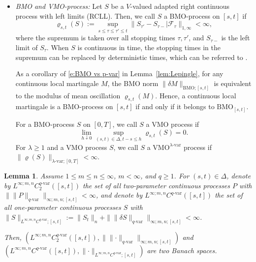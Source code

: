 \documentclass[11pt,reqno]{amsart}
\newtheorem{lemma}{Lemma}[section]
\numberwithin{equation}{section}
\begin{document}
\begin{itemize}[leftmargin=1.2em, labelsep=0.2em]
\ 

\item {\it \emph{BMO} and \emph{VMO}-process:} Let $S$ be a $V$-valued adapted right continuous process with left limits (\textrm{RCLL}). Then, we call $S$ a \textrm{BMO}-process on $[s,t]$ if
\begin{equation*}
\varrho_{s,t}(S) := \sup_{s \le \tau \le \tau' \le t} \big \|S_{\tau'} - S_{\tau-} \big| \mathcal F_{\tau}\big\|_{1,\infty} < \infty,
\end{equation*}
where the supremum is taken over all stopping times $\tau,\tau'$, and  $S_{\tau-}$ is the left limit of $S_{\tau}$. 
When $S$ is continuous in time, the stopping times in the supremum can be replaced by deterministic times, which can be referred to \cite[Proposition~2.2]{le2022quantitative}. 

As a corollary of \eqref{e:BMO vs p-var} in Lemma~\ref{lem:Lepingle}, for any continuous local martingale $M$, the BMO norm $\|\delta M\|_{\mathrm{BMO};[s,t]}$ is equivalent to the modulus of mean oscillation $\varrho_{s,t}(M)$. Hence, a continuous local martingale is a \textrm{BMO}-process on $[s,t]$ if and only if it belongs to $\text{BMO}_{[s,t]}$. 

For a \textrm{BMO}-process $S$ on $[0,T]$, we call $S$ a \textrm{VMO} process if 
\begin{equation*}
\lim_{h\downarrow 0} \sup_{(s,t)\in\Delta, t-s \le h} \varrho_{s,t}(S) = 0.
\end{equation*}
For $\lambda \ge 1$ and a \textrm{VMO} process $S$, we call $S$ a $\mathrm{VMO}^{\lambda\text{-}\mathrm{var}}$ process if $\|\varrho(S)\|_{\lambda\text{-}\mathrm{var};[0,T]} < \infty$.
\end{itemize}

\begin{lemma}\label{lem:Banach property of L C}
Assume $1\le m \le n \le \infty$, $m < \infty$, and $q \ge 1$. For $(s,t) \in \Delta$, denote by $L^{\infty;m,n}C^{q\text{-}\mathrm{var}}_2([s,t])$ the set of all two-parameter continuous processes $P$ with $\| \|P\|_{q\text{-}\mathrm{var}} \|_{\infty;m,n;[s,t]} < \infty$, and denote by $L^{\infty;m,n}C^{q\text{-}\mathrm{var}}([s,t])$ the set of all one-parameter continuous processes $S$ with $\|S\|_{L^{\infty;m,n}C^{q\text{-}\mathrm{var}};[s,t]} := \|S_t\|_n + \| \|\delta S\|_{q\text{-}\mathrm{var}} \|_{\infty;m,n;[s,t]} < \infty$.

Then, $(L^{\infty;m,n}C^{q\text{-}\mathrm{var}}_2([s,t]), \| \|\bm\cdot\|_{q\text{-}\mathrm{var}} \|_{\infty;m,n;[s,t]})$ and $(L^{\infty;m,n}C^{q\text{-}\mathrm{var}}([s,t]), \|\bm\cdot\|_{L^{\infty;m,n}C^{q\text{-}\mathrm{var}};[s,t]})$ are two Banach spaces. 
\end{lemma}
\end{document}
